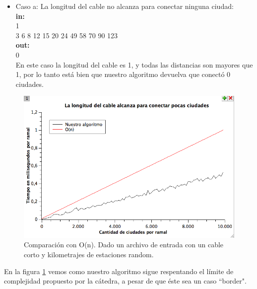 \begin{itemize}
\item Caso a: La longitud del cable no alcanza para conectar ninguna ciudad:\\
\textbf{in:}\\
1\\
3 6 8 12 15 20 24 49 58 70 90 123 \\
\textbf{out:}\\
0\\

En este caso la longitud del cable es 1, y todas las distancias son mayores que 1, por lo tanto está bien que nuestro algoritmo devuelva que conectó 0 ciudades.\\
\end{itemize}

\begin{figure}[H]
\begin{center}

  \includegraphics[width=\linewidth]{../graficos/ej1/CableCorto.png}
  \caption{{\small Comparación con O(n). Dado un archivo de entrada con un cable corto y kilometrajes de estaciones random.}} \label{ej1-tiempo-vs-cant-ciudades-random-long-cable-1}
\endminipage

\end{center}
\end{figure}

En la figura \ref{ej1-tiempo-vs-cant-ciudades-random-long-cable-1} vemos como nuestro algoritmo sigue respentando el límite de complejidad propuesto por la cátedra, a pesar de que éste sea un caso ``border". \\


